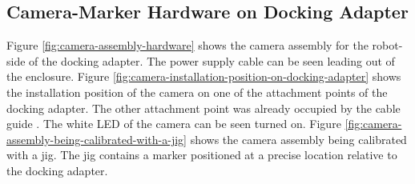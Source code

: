 \subsection{Camera-Marker Hardware on Docking Adapter}
\label{subsection:exploration-4-camera-marker-hardware-on-docking-adapter}

Figure \ref{fig:camera-assembly-hardware} shows the camera assembly for the robot-side of the docking adapter. The power supply cable can be seen leading out of the enclosure. Figure \ref{fig:camera-installation-position-on-docking-adapter} shows the installation position of the camera on one of the attachment points of the docking adapter. The other attachment point was already occupied by the cable guide . The white LED of the camera can be seen turned on. Figure \ref{fig:camera-assembly-being-calibrated-with-a-jig} shows the camera assembly being calibrated with a jig. The jig contains a marker positioned at a precise location relative to the docking adapter.


